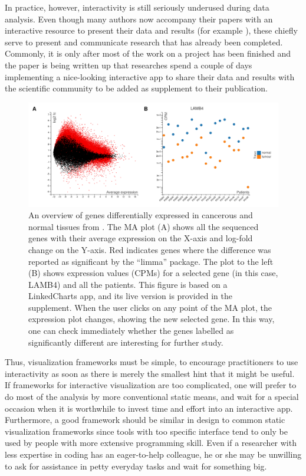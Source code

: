 \documentclass[twocolumn,10pt]{article}
\begin{document}
In practice, however, interactivity is still seriously underused during data analysis. Even though many authors now accompany their papers with an interactive resource to present their data and results (for example \citet{travaglini_2020, roider_2020, kalucka_2020}), these chiefly serve to present and communicate research that has already been completed. Commonly, it is only after most of the work on a project has been finished and the paper is being written up that researches spend a couple of days implementing a nice-looking interactive app to share their data and results with the scientific community \citep{batch_2017} to be added as supplement to their publication. 

\begin{figure}[b]
	\includegraphics[width=\textwidth]{FigD/figD.png}
	\caption{An overview of genes differentially expressed in cancerous and normal tissues from \citet{conway_2015}. The MA plot (A) shows all the sequenced genes with their average expression on the X-axis and log-fold change on the Y-axis. Red indicates genes where the difference was reported as significant by the ``limma''  \citep{ritchie_2015}  package. The plot to the left (B) shows expression values (CPMs) for a selected gene (in this case, LAMB4) and all the patients. This figure is based on a LinkedCharts app, and its live version is provided in the supplement. When the user clicks on any point of the MA plot, the expression plot changes, showing the new selected gene. In this way, one can check immediately whether the genes labelled as significantly different are interesting for further study.}  
	\label{FigD}
\end{figure}

Thus, visualization frameworks must be simple, to encourage practitioners to use interactivity as soon as there is merely the smallest hint that it might be useful. If frameworks for interactive visualization are too complicated, one will prefer to do most of the analysis by more conventional static means, and wait for a special occasion when it is worthwhile to invest time and effort into an interactive app. Furthermore, a good framework should be similar in design to common static visualization frameworks since tools with too specific interface tend to only be used by people with more extensive programming skill. Even if a researcher with less expertise in coding has an eager-to-help colleague, he or she may be unwilling to ask for assistance in petty everyday tasks and wait for something big.
\end{document}
